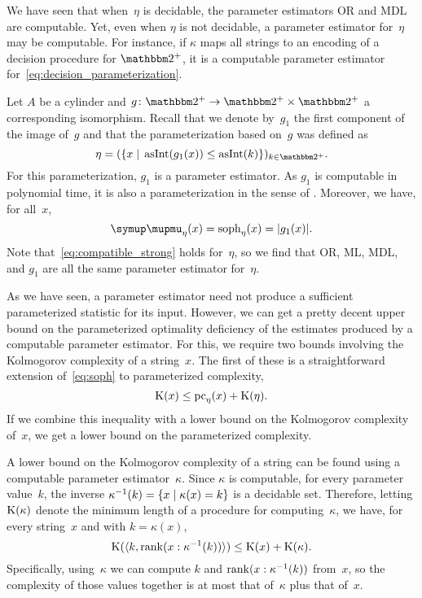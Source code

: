 We have seen that when~$\eta$ is decidable, the parameter estimators OR and MDL are computable.
Yet, even when $\eta$ is not decidable, a parameter estimator for~$\eta$ may be computable.
For instance, if $\kappa$ maps all strings to an encoding of a decision procedure for $\binary^+$, it is a computable parameter estimator for~\eqref{eq:decision_parameterization}.

\begin{example}
\label{ex:p-cylinder:estimator}%
  Let $A$ be a \pdash{}cylinder and $g\colon \binary^+ \to \binary^+ \times \binary^+$ a corresponding isomorphism.
  Recall that we denote by~$g_1$ the first component of the image of~$g$ and that the parameterization based on~$g$ was defined as
  \begin{equation*}
    \eta \deq (\{x \st \asNat(g_1(x)) \le \asNat(k)\})_{k \in \binary^+}.
  \end{equation*}
  For this parameterization, $g_1$ is a parameter estimator.
  As $g_1$ is computable in polynomial time, it is also a parameterization in the sense of \citeauthor{flum2006parameterized}.
  Moreover, we have, for all~$x$,
  \begin{equation*}
    \mu_\eta(x) = \soph_\eta(x) = \length{g_1(x)}.
  \end{equation*}
  Note that~\eqref{eq:compatible_strong} holds for~$\eta$, so we find that OR, ML, MDL, and $g_1$ are all the same parameter estimator for~$\eta$.
\end{example}

As we have seen, a parameter estimator need not produce a sufficient parameterized statistic for its input.
However, we can get a pretty decent upper bound on the parameterized optimality deficiency of the estimates produced by a computable parameter estimator.
For this, we require two bounds involving the Kolmogorov complexity of a string~$x$.
The first of these is a straightforward extension of~\eqref{eq:soph} to parameterized complexity,
\begin{equation}
\label{eq:kclepc}
  \operatorname{K}(x) \le \operatorname{pc}_\eta(x) + \operatorname{K}(\eta).
\end{equation}
If we combine this inequality with a lower bound on the Kolmogorov complexity of~$x$, we get a lower bound on the parameterized complexity.

A lower bound on the Kolmogorov complexity of a string can be found using a computable parameter estimator~$\kappa$.
Since $\kappa$ is computable, for every parameter value~$k$, the inverse $\kappa^{-1}(k) = \{x \;|\; \kappa(x) = k\}$ is a decidable set.
Therefore, letting $\operatorname{K}(\kappa)$ denote the minimum length of a procedure for computing~$\kappa$, we have, for every string~$x$ and with $k = \kappa(x)$,
\begin{equation}
\label{eq:kclowerbound}
  \operatorname{K}({\langle k, \operatorname{rank}(x : \kappa^{-1}(k))\rangle}) \le \operatorname{K}(x) + \operatorname{K}(\kappa).
\end{equation}
Specifically, using~$\kappa$ we can compute $k$ and $\operatorname{rank}(x : \kappa^{-1}(k))$ from~$x$, so the complexity of those values together is at most that of~$\kappa$ plus that of~$x$.

